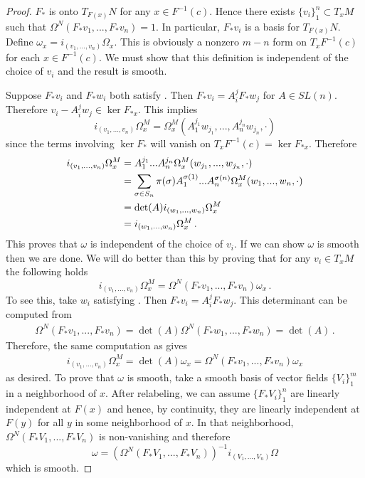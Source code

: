 \begin{proof}
$F_*$ is onto $T_{F(x)}N$ for any $x\in F^{-1}(c)$.  Hence there exists $\{v_i\}_1^n\subset T_xM$ such that $\Omega^N(F_*v_1,...,F_* v_n)=1$.  In particular, $F_* v_i$ is a basis for $T_{F(x)} N$.  Define $\omega_x=i_{(v_1,...,v_n)}\Omega_x$. This is obviously a nonzero $m-n$ form on $T_xF^{-1}(c)$ for each $x\in F^{-1}(c)$.  We must show that this definition is independent of the choice of $v_i$ and the result is smooth.

 Suppose $F_*v_i$ and $F_*w_i$ both satisfy .  Then $F_*v_i=A_i^jF_*w_j$ for $A\in SL(n)$. Therefore $v_i-A_i^jw_j\in \ker F_{*x}$.  This implies
\begin{equation}
i_{(v_1,...,v_n)}\Omega^M_x=\Omega^M_x(A_1^{j_1}w_{j_1},...,A_n^{j_n}w_{j_n},\cdot)
\end{equation}
since the terms involving $\ker F_*$ will vanish on $T_x F^{-1}(c)=\ker F_{*x}$.  Therefore
\begin{align}\label{indOfvProof}
i_{(v_1,...,v_n)}\Omega^M_x&=A_1^{j_1}...A_n^{j_n}\Omega^M_x(w_{j_1},...,w_{j_n},\cdot)\\
&=\sum_{\sigma\in S_n} \pi(\sigma)A_1^{\sigma(1)}...A_n^{\sigma(n)}\Omega^M_x(w_1,...,w_n,\cdot)\notag\\
&=\det(A)i_{(w_1,...,w_n)}\Omega^M_x\notag\\
&=i_{(w_1,...,w_n)}\Omega^M_x\,.\notag
\end{align}
This proves that $\omega$ is independent of the choice of $v_i$.  If we can show $\omega$ is smooth then we are done.  We will do better than this by proving that for any  $v_i\in T_xM$ the following holds
\begin{equation}
i_{(v_1,...,v_n)}\Omega^M_x=\Omega^N(F_*v_1,...,F_*v_n)\omega_x\,.
\end{equation}
To see this, take $w_i$ satisfying .  Then $F_*v_i=A_i^j F_*w_j$. This determinant can be computed from
\begin{align}
\Omega^N(F_*v_1,...,F_*v_n)=\det(A)\Omega^N(F_*w_1,...,F_*w_n)=\det(A)\,.
\end{align}
 Therefore, the same computation as  gives
\begin{align}
i_{(v_1,...,v_n)}\Omega^M_x=\det(A)\omega_x=\Omega^N(F_*v_1,...,F_*v_n)\omega_x
\end{align}
as desired.  To prove that $\omega$ is smooth, take a smooth basis of vector fields $\{V_i\}_1^m$ in a neighborhood of $x$.  After relabeling, we can assume $\{F_*V_i\}_1^n$ are linearly independent at $F(x)$ and hence, by continuity, they are linearly independent at $F(y)$ for all $y$ in some neighborhood of $x$.  In that neighborhood, $\Omega^N(F_*V_1,...,F_*V_n)$ is non-vanishing and therefore
\begin{equation}
\omega=(\Omega^N(F_*V_1,...,F_*V_n))^{-1}i_{(V_1,...,V_n)}\Omega
\end{equation} 
which is smooth.
\end{proof}

